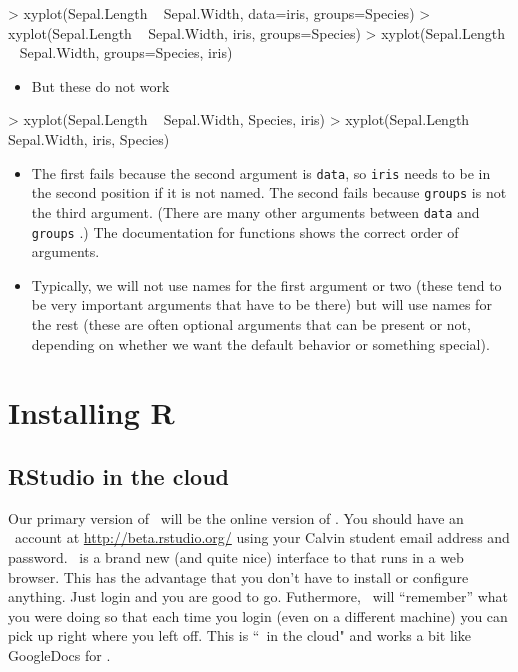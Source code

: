 \begin{Schunk}
\begin{Sinput}
> xyplot(Sepal.Length ~ Sepal.Width, data=iris, groups=Species)
> xyplot(Sepal.Length ~ Sepal.Width, iris, groups=Species)
> xyplot(Sepal.Length ~ Sepal.Width, groups=Species, iris)
\end{Sinput}
\end{Schunk}
\begin{itemize}
\item[]
But these do not work
\end{itemize}

\begin{Schunk}
\begin{Sinput}
> xyplot(Sepal.Length ~ Sepal.Width, Species, iris)
> xyplot(Sepal.Length ~ Sepal.Width, iris, Species)
\end{Sinput}
\end{Schunk}
\begin{itemize}
\item[]
The first fails because the second argument is \verb!data!, so \verb!iris!
needs to be in the second position if it is not named.
The second fails because \verb!groups! is not the third argument.
(There are many other arguments between \verb!data! and \verb!groups! .)
The documentation for functions shows the correct order of arguments.
\item
Typically, we will not use names for the first argument or two (these tend to be 
very important arguments that have to be there) but will use names for the rest (these 
are often optional arguments that can be present or not, depending on whether we want 
the default behavior or something special).
\end{itemize}

\section{Installing R}

\subsection{RStudio in the cloud}
Our primary version of \R\ will be the online version of \Rstudio.  
You should have an \Rstudio\ account at \url{http://beta.rstudio.org/} 
using your Calvin student email address and password.
\Rstudio\ is a brand new (and quite nice) interface to \R that runs in a web browser.
This has the advantage that you don't have to install or configure anything.  Just login
and you are good to go.  Futhermore, \Rstudio\ will ``remember'' what you were doing so that
each time you login (even on a different machine) you can pick up right where you left off.
This is ``\R\ in the cloud" and works a bit like GoogleDocs for \R.

